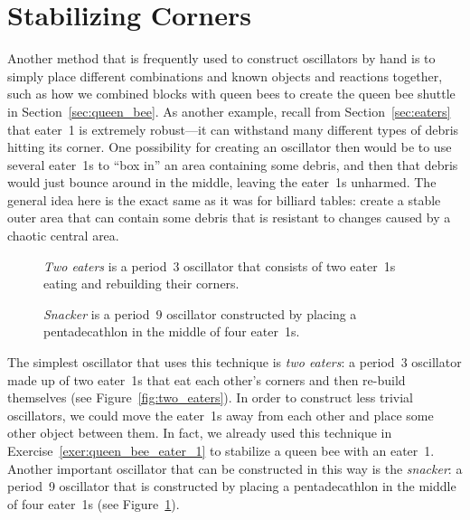 \section{Stabilizing Corners}\label{sec:corner_oscillators}

Another method that is frequently used to construct oscillators by hand is to simply place different combinations and known objects and reactions together, such as how we combined blocks with queen bees to create the queen bee shuttle in Section~\ref{sec:queen_bee}. As another example, recall from Section~\ref{sec:eaters} that eater~1 is extremely robust---it can withstand many different types of debris hitting its corner. One possibility for creating an oscillator then would be to use several eater~1s to ``box in'' an area containing some debris, and then that debris would just bounce around in the middle, leaving the eater~1s unharmed. The general idea here is the exact same as it was for billiard tables: create a stable outer area that can contain some debris that is resistant to changes caused by a chaotic central area.

\begin{figure}[!htb]
	\centering
	\begin{minipage}{.48\textwidth}
		\centering
		\caption{\emph{Two eaters} is a period~$3$ oscillator that consists of two eater~1s eating and rebuilding their corners.}\label{fig:two_eaters}
	\end{minipage} \hfill %
	\begin{minipage}{.48\textwidth}
		\centering
		\caption{\emph{Snacker} is a period~$9$ oscillator constructed by placing a pentadecathlon in the middle of four eater~1s.}\label{fig:snacker}
	\end{minipage}
\end{figure}

The simplest oscillator that uses this technique is \emph{two eaters}: a period~$3$ oscillator made up of two eater~1s that eat each other's corners and then re-build themselves (see Figure~\ref{fig:two_eaters}). In order to construct less trivial oscillators, we could move the eater~1s away from each other and place some other object between them. In fact, we already used this technique in Exercise~\ref{exer:queen_bee_eater_1} to stabilize a queen bee with an eater~1. Another important oscillator that can be constructed in this way is the \emph{snacker}: a period~9 oscillator that is constructed by placing a pentadecathlon in the middle of four eater~1s (see Figure~\ref{fig:snacker}).


